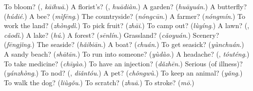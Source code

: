 \begin{tcolorbox}[breakable,colback=teal!4,colframe=teal!35!black,title={Before you move on}]
To bloom? (\textbf{}, \emph{kāihuā}.) A florist's? (\textbf{}, \emph{huādiàn}.) A garden? (\emph{huāyuán}.) A butterfly? (\emph{húdié}.) A bee? (\emph{mìfēng}.) The countryside? (\emph{nóngcūn}.) A farmer? (\emph{nóngmín}.) To work the land? (\emph{zhòngdì}.) To pick fruit? (\emph{zhāi}.) To camp out? (\emph{lùyíng}.) A lawn? (\textbf{}, \emph{cǎodì}.) A lake? (\emph{hú}.) A forest? (\emph{sēnlín}.) Grassland? (\emph{cǎoyuán}.) Scenery? (\emph{fēngjǐng}.) The seaside? (\emph{hǎibiān}.) A boat? (\emph{chuán}.) To get seasick? (\emph{yùnchuán}.) A sandy beach? (\emph{shātān}.) To run into someone? (\emph{yùdào}.) A headache? (\textbf{}, \emph{tóuténg}.) To take medicine? (\emph{chīyào}.) To have an injection? (\emph{dǎzhēn}.) Serious (of illness)? (\emph{yánzhòng}.) To nod? (\textbf{}, \emph{diǎntóu}.) A pet? (\emph{chǒngwù}.) To keep an animal? (\emph{yǎng}.) To walk the dog? (\emph{liùgǒu}.) To scratch? (\emph{zhuā}.) To stroke? (\emph{mō}.)
\end{tcolorbox}
